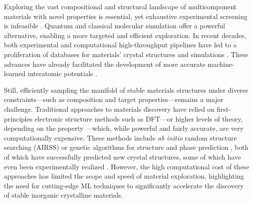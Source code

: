 Exploring the vast compositional and structural landscape of multicomponent materials with novel properties is essential, yet exhaustive experimental screening is infeasible \cite{cantor_multicomponent_2021}. Quantum and classical molecular simulation offer a powerful alternative, enabling a more targeted and efficient exploration.
In recent decades, both experimental \cite{potyrailo_combinatorial_2011, maier_early_2019} and computational \cite{jain_highthroughput_2011, curtarolo_highthroughput_2013} high-throughput pipelines have led to a proliferation of databases for materials' crystal structures \cite{bergerhoff_inorganic_1983, mehl_aflow_2017} and simulations \cite{blaiszik_materials_2016, vita_colabfit_2023, fuemmeler2024advancing}. These advances have already facilitated the development of more accurate machine-learned interatomic potentials \cite{batzner_e3equivariant_2022, batatia_mace_2022, chen_universal_2022}.

Still, efficiently sampling the manifold of stable materials structures under diverse constraints---such as composition and target properties---remains a major challenge. Traditional approaches to materials discovery have relied on first-principles electronic structure methods such as DFT---or higher levels of theory, depending on the property \cite{booth2013towards, PhysRevB.89.205427, PhysRevB.102.045146}---which, while powerful and fairly accurate, are very computationally expensive. These methods include \textit{ab initio} random structure searching (AIRSS) \cite{pickard_initio_2011} or genetic algorithms for structure and phase prediction \cite{tipton_grand_2013}, both of which have successfully predicted new crystal structures, some of which have even been experimentally realized \cite{oganov_structure_2019}.
However, the high computational cost of these approaches has limited the scope and speed of material exploration, highlighting the need for cutting-edge ML techniques to significantly accelerate the discovery of stable inorganic crystalline materials.